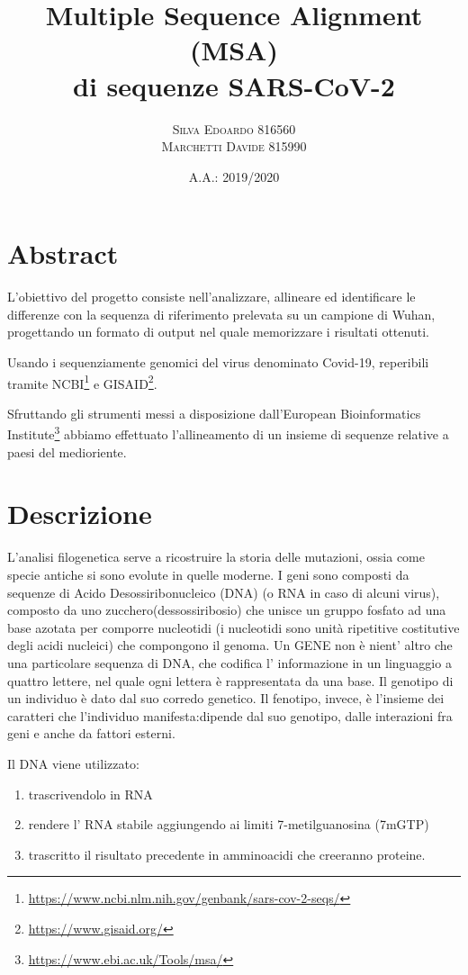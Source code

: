 \documentclass[11pt,italian]{article}
\title{Multiple Sequence Alignment (MSA) \\ di sequenze SARS-CoV-2}
\date{A.A.: 2019/2020}
\author{
    \textsc{Silva Edoardo} 816560 \\
    \textsc{Marchetti Davide} 815990
}
\begin{document}
\maketitle

\section*{Abstract}
L'obiettivo del progetto consiste nell'analizzare, allineare ed identificare le differenze con la sequenza di riferimento prelevata su un campione di Wuhan, progettando un formato di output nel quale memorizzare i risultati ottenuti.

Usando i sequenziamente genomici del virus denominato Covid-19, reperibili tramite NCBI\footnote{\url{https://www.ncbi.nlm.nih.gov/genbank/sars-cov-2-seqs/}} e GISAID\footnote{\url{https://www.gisaid.org/}}.

Sfruttando gli strumenti messi a disposizione dall'European Bioinformatics Institute\footnote{\url{https://www.ebi.ac.uk/Tools/msa/}} abbiamo effettuato l'allineamento di un insieme di sequenze relative a paesi del medioriente.

\newpage
\section{Descrizione}
L'analisi filogenetica serve a ricostruire la storia delle mutazioni, ossia come specie antiche si sono evolute in quelle moderne.\newline
I geni sono composti da sequenze di Acido Desossiribonucleico (DNA) (o RNA in caso di alcuni virus), composto da uno zucchero(dessossiribosio) che unisce un gruppo fosfato ad una base azotata per comporre nucleotidi (i nucleotidi sono unità ripetitive costitutive degli acidi nucleici) che compongono il genoma.\newline
Un GENE non è nient' altro che una particolare sequenza di DNA, che codifica l' informazione in un linguaggio a quattro lettere, nel quale ogni lettera è rappresentata da una base.\newline
Il genotipo di un individuo è dato dal suo corredo genetico.
Il fenotipo, invece, è l'insieme dei caratteri che l'individuo manifesta:dipende dal suo genotipo, dalle interazioni fra geni e anche da fattori
esterni.

Il DNA viene utilizzato:
\begin{enumerate}
  \item trascrivendolo in RNA
  \item rendere l' RNA stabile aggiungendo ai limiti 7-metilguanosina (7mGTP)
  \item trascritto il risultato precedente in amminoacidi che creeranno proteine.
\end{enumerate}
\end{document}
